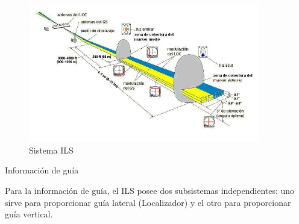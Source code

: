 \begin{figure}[!h]
  \centering
  \includegraphics[width = 0.9\textwidth]{06.radionavegacion/Imagenes/06.Sistemas.Aproximacion/06_ILS.png}
    \caption{ Sistema ILS}
  \label{fig:06.ILS.sistema}
\end{figure}

Información de guía

Para la información de guía, el ILS posee dos subsistemas independientes: uno sirve para proporcionar guía lateral (Localizador) y el otro para proporcionar guía vertical.

